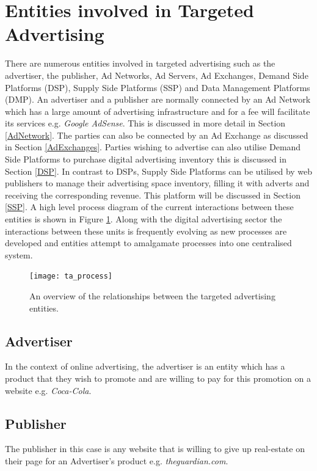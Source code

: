 \documentclass[12pt]{article}
\begin{document}
\pagebreak

\section{Entities involved in Targeted Advertising} \label{entities}
There are numerous entities involved in targeted advertising such as the advertiser, the publisher, Ad Networks, Ad Servers, Ad Exchanges, Demand Side Platforms (DSP), Supply Side Platforms (SSP) and Data Management Platforms (DMP). An advertiser and a publisher are normally connected by an Ad Network which has a large amount of advertising infrastructure and for a fee will facilitate its services e.g. \textit{Google AdSense}. This is discussed in more detail in Section \ref{AdNetwork}. The parties can also be connected by an Ad Exchange as discussed in Section \ref{AdExchanges}. Parties wishing to advertise can also utilise Demand Side Platforms to purchase digital advertising inventory this is discussed in Section \ref{DSP}. In contrast to DSPs, Supply Side Platforms can be utilised by web publishers to manage their advertising space inventory, filling it with adverts and receiving the corresponding revenue. This platform will be discussed in Section \ref{SSP}. A high level process diagram of the current interactions between these entities is shown in Figure \ref{fig:ta_process}. Along with the digital advertising sector the interactions between these units is frequently evolving as new processes are developed and entities attempt to amalgamate processes into one centralised system.

\begin{figure}[H]
    \centering
    \texttt{[image: ta\_process]}
    \caption{An overview of the relationships between the targeted advertising entities.}
    \label{fig:ta_process}
\end{figure}

\subsection{Advertiser}
In the context of online advertising, the advertiser is an entity which has a product that they wish to promote and are willing to pay for this promotion on a website e.g. \textit{Coca-Cola}.

\subsection{Publisher} 
The publisher in this case is any website that is willing to give up real-estate on their page for an Advertiser's product e.g. \textit{theguardian.com}.
\end{document}
